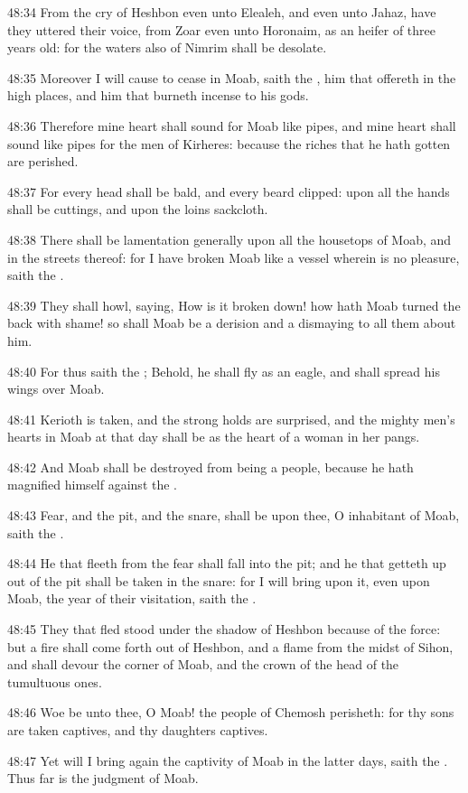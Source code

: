 48:34 From the cry of Heshbon even unto Elealeh, and even unto Jahaz,
have they uttered their voice, from Zoar even unto Horonaim, as an
heifer of three years old: for the waters also of Nimrim shall be
desolate.

48:35 Moreover I will cause to cease in Moab, saith the \LORD, him that
offereth in the high places, and him that burneth incense to his gods.

48:36 Therefore mine heart shall sound for Moab like pipes, and mine
heart shall sound like pipes for the men of Kirheres: because the
riches that he hath gotten are perished.

48:37 For every head shall be bald, and every beard clipped: upon all
the hands shall be cuttings, and upon the loins sackcloth.

48:38 There shall be lamentation generally upon all the housetops of
Moab, and in the streets thereof: for I have broken Moab like a vessel
wherein is no pleasure, saith the \LORD.

48:39 They shall howl, saying, How is it broken down! how hath Moab
turned the back with shame! so shall Moab be a derision and a
dismaying to all them about him.

48:40 For thus saith the \LORD; Behold, he shall fly as an eagle, and
shall spread his wings over Moab.

48:41 Kerioth is taken, and the strong holds are surprised, and the
mighty men's hearts in Moab at that day shall be as the heart of a
woman in her pangs.

48:42 And Moab shall be destroyed from being a people, because he hath
magnified himself against the \LORD.

48:43 Fear, and the pit, and the snare, shall be upon thee, O
inhabitant of Moab, saith the \LORD.

48:44 He that fleeth from the fear shall fall into the pit; and he
that getteth up out of the pit shall be taken in the snare: for I will
bring upon it, even upon Moab, the year of their visitation, saith the
\LORD.

48:45 They that fled stood under the shadow of Heshbon because of the
force: but a fire shall come forth out of Heshbon, and a flame from
the midst of Sihon, and shall devour the corner of Moab, and the crown
of the head of the tumultuous ones.

48:46 Woe be unto thee, O Moab! the people of Chemosh perisheth: for
thy sons are taken captives, and thy daughters captives.

48:47 Yet will I bring again the captivity of Moab in the latter days,
saith the \LORD. Thus far is the judgment of Moab.

